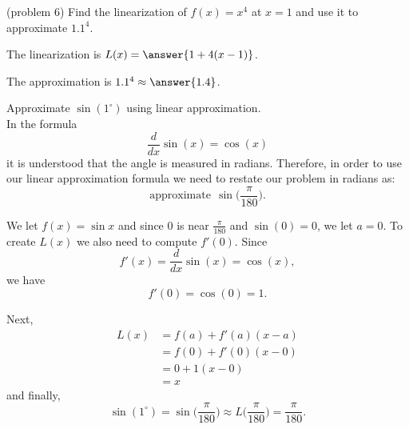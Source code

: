 \documentclass{ximera}
\begin{document}
\begin{problem}(problem 6)
Find the linearization of $f(x) = x^4$ at $x = 1$ and use it to approximate $1.1^4$.

The linearization is  $L(x) = \answer{1 + 4 (x-1)}$.

The approximation is $1.1^4 \approx \answer{1.4}$.
\end{problem}

\begin{example}[example 7]
Approximate $\sin(1^{\circ})$ using linear approximation.\\
In the formula 
\[ \frac{d}{dx} \sin(x) = \cos(x) \]
it is understood that the angle is measured in radians. Therefore, in order to use our linear approximation 
formula we need to restate our problem in radians as:  
\[\text{approximate} \ \ \sin\big(\frac{\pi}{180}\big).\]

We let $f(x) = \sin x$ and since 0 is near $\frac{\pi}{180}$ and $\sin(0) = 0$, we let 
$a = 0$. To create $L(x)$ we also need to compute $f'(0)$. 
Since 
\[f'(x) = \frac{d}{dx} \sin(x) = \cos(x),\] 
we have
\[f'(0) = \cos(0) = 1.\]

Next, 
\begin{align*}
L(x) &= f(a) + f'(a)(x - a) \\
&= f(0) + f'(0)(x - 0) \\
&= 0 + 1(x - 0)\\
&= x
\end{align*}
and finally,
\[\sin(1^{\circ}) = \sin\big(\frac{\pi}{180}\big) \approx L\big(\frac{\pi}{180}\big) = \frac{\pi}{180}.\]
\end{example}


 

\begin{center}
\begin{foldable}
\end{foldable}
\end{center}
\end{document}
